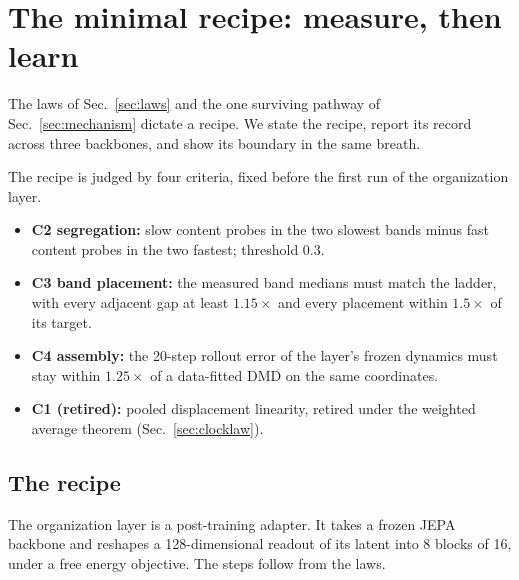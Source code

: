 \documentclass[11pt]{article}
\newcommand{\term}[1]{\textbf{#1}}
\begin{document}
\section{The minimal recipe: measure, then learn}
\label{sec:recipe}

The laws of Sec.~\ref{sec:laws} and the one surviving pathway of Sec.~\ref{sec:mechanism} dictate a recipe.
We state the recipe, report its record across three backbones, and show its boundary in the same breath.

The recipe is judged by four criteria, fixed before the first run of the organization layer.
\begin{itemize}
\item \term{C2 segregation:} slow content probes in the two slowest bands minus fast content probes in the two fastest; threshold 0.3.
\item \term{C3 band placement:} the measured band medians must match the ladder, with every adjacent gap at least $1.15 \times$ and every placement within $1.5 \times$ of its target.
\item \term{C4 assembly:} the 20-step rollout error of the layer's frozen dynamics must stay within $1.25 \times$ of a data-fitted DMD on the same coordinates.
\item \term{C1 (retired):} pooled displacement linearity, retired under the weighted average theorem (Sec.~\ref{sec:clocklaw}).
\end{itemize}

\subsection{The recipe}

The organization layer is a post-training adapter.
It takes a frozen JEPA backbone and reshapes a 128-dimensional readout of its latent into 8 blocks of 16, under a free energy objective.
The steps follow from the laws.
\end{document}
